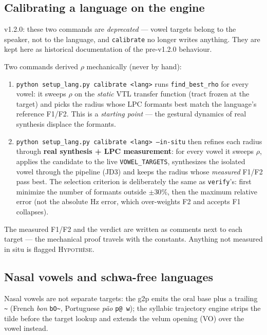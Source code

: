 \documentclass[11pt,a4paper]{article}
\newcommand{\code}[1]{\texttt{#1}}
\newcommand{\sampkey}[1]{\texttt{#1}}
\begin{document}
\subsection{Calibrating a language on the engine}

v1.2.0: these two commands are \emph{deprecated} --- vowel
targets belong to the speaker, not to the language, and
\code{calibrate} no longer writes anything. They are kept
here as historical documentation of the pre-v1.2.0 behaviour.

Two commands derived $\rho$ mechanically (never by hand):

\begin{enumerate}
\item \code{python setup\_lang.py calibrate <lang>} runs
      \code{find\_best\_rho} for every vowel: it sweeps $\rho$ on
      the \emph{static} VTL transfer function (tract frozen at the
      target) and picks the radius whose LPC formants best match the
      language's reference F1/F2. This is a \emph{starting point} ---
      the gestural dynamics of real synthesis displace the formants.
\item \code{python setup\_lang.py calibrate <lang> --in-situ} then
      refines each radius through \textbf{real synthesis + LPC
      measurement}: for every vowel it sweeps $\rho$, applies the
      candidate to the live \code{VOWEL\_TARGETS}, synthesizes the
      isolated vowel through the pipeline (JD3) and keeps the radius
      whose \emph{measured} F1/F2 pass best. The selection criterion
      is deliberately the same as \code{verify}'s: first minimize the
      number of formants outside $\pm30\%$, then the maximum relative
      error (not the absolute Hz error, which over-weights F2 and
      accepts F1 collapses).
\end{enumerate}

The measured F1/F2 and the verdict are written as comments next to
each target --- the mechanical proof travels with the constants.
Anything not measured in situ is flagged \textsc{Hypoth\`ese}.

\subsection{Nasal vowels and schwa-free languages}

Nasal vowels are not separate targets: the g2p emits the oral base
plus a trailing \sampkey{\textasciitilde} (French
\emph{bon} \sampkey{bO\textasciitilde}, Portuguese \emph{p\~ao}
\sampkey{p@~w}); the syllabic trajectory engine strips the tilde
before the target lookup and extends the velum opening (VO) over the
vowel instead.
\end{document}
